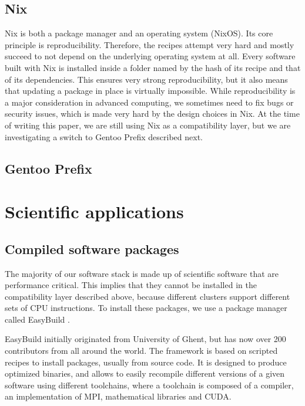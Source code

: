 \documentclass[sigconf]{acmart}
\begin{document}
\subsection{Nix}
\label{sub:Nix}
Nix \cite{Nix} is both a package manager and an operating system (NixOS). Its core principle is reproducibility.
Therefore, the recipes attempt very hard and mostly succeed to not depend on the underlying operating system at all.
Every software built with Nix is installed inside a folder named by the hash of its recipe and that of its
dependencies. This ensures very strong reproducibility, but it also means that updating a package in place is virtually
impossible. While reproducibility is a major consideration in advanced computing, we sometimes need to fix bugs or
security issues, which is made very hard by the design choices in Nix. At the time of writing this paper, we are still
using Nix as a compatibility layer, but we are investigating a switch to Gentoo Prefix described next.

\subsection{Gentoo Prefix}
\label{sub:Gentoo_Prefix}

\section{Scientific applications}
\label{sec:Scientific_applications}

\subsection{Compiled software packages}
\label{sub:Compiled_software_packages}
The majority of our software stack is made up of scientific software that are performance critical. This implies that
they cannot be installed in the compatibility layer described above, because different clusters support different sets
of CPU instructions. To install these packages, we use a package manager called EasyBuild
\cite{EasyBuild2012,EasyBuild2014,EasyBuild2016}.

EasyBuild initially originated from University of Ghent, but has now over 200 contributors from all around the world.
The framework is based on scripted recipes to install packages, usually from source code. It is designed to produce
optimized binaries, and allows to easily recompile different versions of a given software using different toolchains,
where a toolchain is composed of a compiler, an implementation of MPI, mathematical libraries and CUDA.
\end{document}
